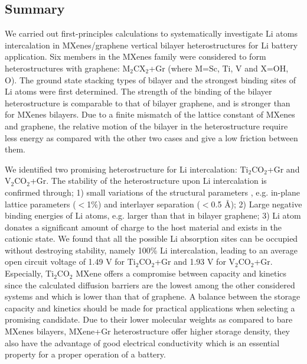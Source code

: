 \subsection{Summary}
We carried out first-principles calculations to systematically investigate Li atoms intercalation in MXenes/graphene vertical bilayer heterostructures for Li battery application. Six members in the MXenes family were considered to form heterostructures with graphene: M$_2$CX$_2$+Gr (where M=Sc, Ti, V and X=OH, O). The ground state stacking types of bilayer and the strongest binding sites of Li atoms were first determined. The strength of the binding of the bilayer heterostructure is comparable to that of bilayer graphene, and is stronger than for MXenes bilayers. Due to a finite mismatch of the lattice constant of MXenes and graphene, the relative motion of the bilayer in the heterostructure require less energy as compared with the other two cases and give a low friction between them.

We identified two promising heterostructure for Li intercalation: Ti$_2$CO$_2$+Gr and V$_2$CO$_2$+Gr. The stability of the heterostructure upon Li intercalation is confirmed through; 1) small variations of the structural parameters , e.g. in-plane lattice parameters ($<$1\%) and interlayer separation ($<$0.5 {\AA}); 2) Large negative binding energies of Li atoms, e.g. larger than that in bilayer graphene; 3) Li atom donates a significant amount of charge to the host material and exists in the cationic state. We found that all the possible Li absorption sites can be occupied without destroying stability, namely 100\% Li intercalation, leading to an average open circuit voltage of 1.49 V for Ti$_2$CO$_2$+Gr and 1.93 V for V$_2$CO$_2$+Gr. Especially, Ti$_2$CO$_2$ MXene offers a compromise between capacity and kinetics since the calculated diffusion barriers are the lowest among the other considered systems and which is lower than that of graphene.  A balance between the storage capacity and kinetics should be made for practical applications  when selecting a promising candidate. Due to their lower molecular weights as compared to bare MXenes bilayers,  MXene+Gr heterostructure offer higher storage density, they also have the advantage of good electrical conductivity which is an essential property for a proper operation of a battery. 